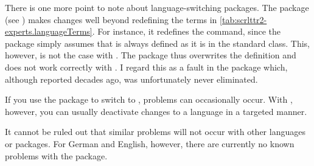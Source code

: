 There is one more point to note about language-switching
packages. The
 package (see
\cite{package:french}) makes changes well beyond redefining the terms in
\autoref{tab:scrlttr2-experts.languageTerms}. For instance, it redefines the
 command, since the package simply assumes that
 is always defined as it is in the standard
 class. This, however, is not the case with \KOMAScript{}. The
 package thus overwrites the definition and does not work
correctly with \KOMAScript. I regard this as a fault in the 
package which, although reported decades ago, was unfortunately never
eliminated.

If you use the  package to switch to
, problems can occasionally occur. With ,
however, you can usually deactivate changes to a language in a targeted
manner.%
\iffalse%
\ If the package \Package{french} is not installed, the problem with
  \Package{babel} does not arise. Similarly, the problem usually does not
  exist when you use \Package{babel} with other varieties of French such as
  \PValue{acadian}, \PValue{canadien}, \PValue{francais} or \PValue{frenchb}
  instead of \PValue{french}.
\fi

\iffalse%
  However, with \Package{babel} version 3.7j and above, this problem only occurs
  if the option explicitly indicates that \Package{babel} should use the
  \Package{french} package.
%
\iftrue
  If you cannot be sure you are not using an old version of \Package{babel}, I
  recommend you use
\begin{lstcode}
  \usepackage[...,frenchb,...]{babel}
\end{lstcode}
  to select French.
    \iffalse %
      If necessary, you can still switch to French with
      \Macro{selectlanguage}\PParameter{french}.%
    \fi%
\fi 
\fi  

\iftrue
  It cannot be ruled out that similar problems will not occur with other
  languages or packages. For German and English, however, there are currently
  no known problems with the  package.
\fi


